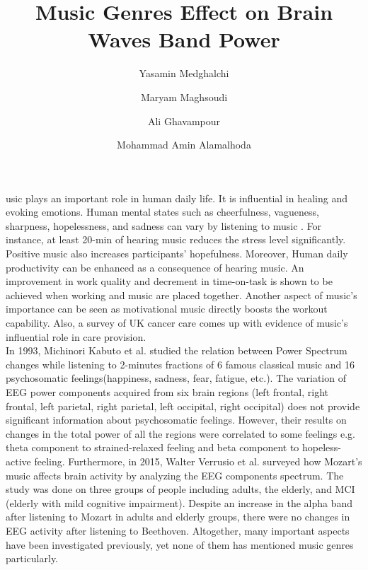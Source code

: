 \documentclass[9pt,twocolumn]{paper-template}
\title{Music Genres Effect on Brain Waves Band Power}
\author[a]{Yasamin Medghalchi}
\author[a]{Maryam Maghsoudi}
\author[a]{Ali Ghavampour}
\author[a]{Mohammad Amin Alamalhoda}
\affil[a]{Student, EE Department, Sharif University of Technology}
\begin{document}
\maketitle
\thispagestyle{firststyle}

usic plays an important role in human daily life. It is influential in healing and evoking emotions. Human mental states such as cheerfulness, vagueness, sharpness, hopelessness, and sadness can vary by listening to music \cite{kabuto1993}. For instance, at least 20-min of hearing music reduces the stress level significantly\cite{linnemann2018}. Positive music also increases participants' hopefulness\cite{Ziv2011}. Moreover, Human daily productivity can be enhanced as a consequence of hearing music. An improvement in work quality and decrement in time-on-task is shown to be achieved when working and music are placed together\cite{Lesiuk2005}. Another aspect of music's importance can be seen as motivational music directly boosts the workout capability\cite{Karageorghis2010}. Also, a survey of UK cancer care comes up with evidence of music's influential role in care provision\cite{Daykin2006}. \\

In 1993, Michinori Kabuto et al. studied the relation between Power Spectrum changes while listening to 2-minutes fractions of 6 famous classical music and 16 psychosomatic feelings(happiness, sadness, fear, fatigue, etc.). The variation of EEG power components acquired from six brain regions (left frontal, right frontal, left parietal, right parietal, left occipital, right occipital) does not provide significant information about psychosomatic feelings. However, their results on changes in the total power of all the regions were correlated to some feelings e.g. theta component to strained-relaxed feeling and beta component to hopeless-active feeling\cite{kabuto1993}. Furthermore, in 2015, Walter Verrusio et al. surveyed how Mozart's music affects brain activity by analyzing the EEG components spectrum. The study was done on three groups of people including adults, the elderly, and MCI (elderly with mild cognitive impairment). Despite an increase in the alpha band after listening to Mozart in adults and elderly groups, there were no changes in EEG activity after listening to Beethoven\cite{Verrusio2015}. Altogether, many important aspects have been investigated previously, yet none of them has mentioned music genres particularly. 
\\
\end{document}
